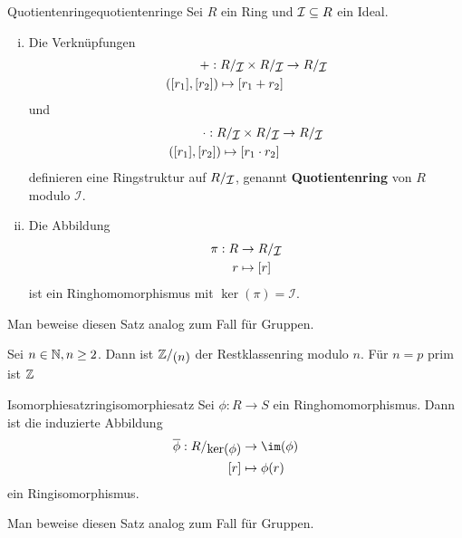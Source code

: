 \begin{satz}{Quotientenringe}{quotientenringe}
Sei $R$ ein Ring und $\mathcal{I} \subseteq R$ ein Ideal.
\begin{enumerate}[(i)]
\item Die Verknüpfungen 
\begin{equation}
\begin{split}
+: \quotient{R}{\mathcal{I}} \times \quotient{R}{\mathcal{I}} &\to \quotient{R}{\mathcal{I}}\\
([r_1], [r_2]) \mapsto [r_1 + r_2]
\end{split}
\end{equation}
und
\begin{equation}
\begin{split}
\cdot: \quotient{R}{\mathcal{I}} \times \quotient{R}{\mathcal{I}} &\to \quotient{R}{\mathcal{I}}\\
([r_1], [r_2]) \mapsto [r_1 \cdot r_2]
\end{split}
\end{equation}
definieren eine Ringstruktur auf $\quotient{R}{\mathcal{I}}$, genannt \textbf{Quotientenring} von $R$ modulo $\mathcal{I}$.
\item Die Abbildung 
\begin{equation}
\begin{split}
\pi: R &\to \quotient{R}{\mathcal{I}}\\
r &\mapsto [r]
\end{split}
\end{equation}
ist ein Ringhomomorphismus mit $\ker (\pi) = \mathcal{I}$.
\end{enumerate}
\end{satz}
\begin{übung}
Man beweise diesen Satz analog zum Fall für Gruppen.
\end{übung}
\begin{beispiel}
Sei $n \in \mathbb{N}, n \geq 2$. Dann ist $\quotient{\Z}{(n)}$ der Restklassenring modulo $n$. Für $n=p$ prim ist $\mathbb{Z}$
\end{beispiel}
\begin{theorem}{Isomorphiesatz}{ringisomorphiesatz}
Sei $\phi: R \to S$ ein Ringhomomorphismus. Dann ist die induzierte Abbildung
\begin{equation}
\begin{split}
\overline{\phi}: \quotient{R}{\ker (\phi)} &\to \im (\phi)\\
[r] &\mapsto \phi(r)
\end{split}
\end{equation}
ein Ringisomorphismus.
\end{theorem}
\begin{übung}
Man beweise diesen Satz analog zum Fall für Gruppen.
\end{übung}

